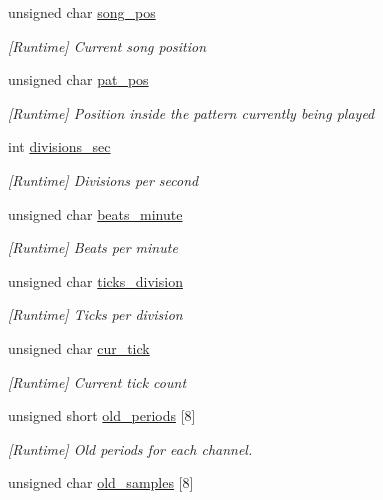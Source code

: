 \begin{DoxyCompactItemize}
unsigned char \hyperlink{structModMusic_acece3d1a6fa99389d79490b812be31ba}{song\+\_\+pos}
\begin{DoxyCompactList}\small\item\em \mbox{[}Runtime\mbox{]} Current song position \end{DoxyCompactList}\item 
unsigned char \hyperlink{structModMusic_a2dc34fe1aa5c7fd23be5f6dfbd47fa7d}{pat\+\_\+pos}
\begin{DoxyCompactList}\small\item\em \mbox{[}Runtime\mbox{]} Position inside the pattern currently being played \end{DoxyCompactList}\item 
int \hyperlink{structModMusic_a64991ec01bd181942a99411e69713571}{divisions\+\_\+sec}
\begin{DoxyCompactList}\small\item\em \mbox{[}Runtime\mbox{]} Divisions per second \end{DoxyCompactList}\item 
unsigned char \hyperlink{structModMusic_a69d46bccf5dd49685b43830ee03fbc3d}{beats\+\_\+minute}
\begin{DoxyCompactList}\small\item\em \mbox{[}Runtime\mbox{]} Beats per minute \end{DoxyCompactList}\item 
unsigned char \hyperlink{structModMusic_afa6eab79cc47740d4f146e2adfc16c9c}{ticks\+\_\+division}
\begin{DoxyCompactList}\small\item\em \mbox{[}Runtime\mbox{]} Ticks per division \end{DoxyCompactList}\item 
unsigned char \hyperlink{structModMusic_a34dae5fc4930940b0cda5fd44467c751}{cur\+\_\+tick}
\begin{DoxyCompactList}\small\item\em \mbox{[}Runtime\mbox{]} Current tick count \end{DoxyCompactList}\item 
unsigned short \hyperlink{structModMusic_aaaa612da0b0920d51b87972c94e14ac0}{old\+\_\+periods} \mbox{[}8\mbox{]}
\begin{DoxyCompactList}\small\item\em \mbox{[}Runtime\mbox{]} Old periods for each channel. \end{DoxyCompactList}\item 
unsigned char \hyperlink{structModMusic_a4a05f396814c9fd4cf163fad7ea0f852}{old\+\_\+samples} \mbox{[}8\mbox{]}

\end{DoxyCompactItemize}

